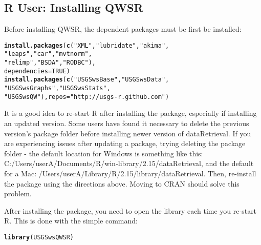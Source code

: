 \documentclass[a4paper,11pt]{article}\usepackage{graphicx, color}
\makeatletter
\newcommand{\hlfunctioncall}[1]{\textcolor[rgb]{0.501960784313725,0,0.329411764705882}{\textbf{#1}}}%
\newcommand{\hlstring}[1]{\textcolor[rgb]{0.6,0.6,1}{#1}}%
\newenvironment{kframe}{%
 \def\at@end@of@kframe{}%
 \ifinner\ifhmode%
  \def\at@end@of@kframe{\end{minipage}}%
  \begin{minipage}{\columnwidth}%
 \fi\fi%
 \def\FrameCommand##1{\hskip\@totalleftmargin \hskip-\fboxsep
 \colorbox{shadecolor}{##1}\hskip-\fboxsep
     \hskip-\linewidth \hskip-\@totalleftmargin \hskip\columnwidth}%
 \MakeFramed {\advance\hsize-\width
   \@totalleftmargin\z@ \linewidth\hsize
   \@setminipage}}%
 {\par\unskip\endMakeFramed%
 \at@end@of@kframe}
\newenvironment{knitrout}{}{} %
\makeatother
\begin{document}
\subsection{R User: Installing QWSR}
Before installing QWSR, the dependent packages must be first be installed:

\begin{knitrout}
\color{fgcolor}\begin{kframe}
\begin{alltt}
\hlfunctioncall{install.packages}(\hlfunctioncall{c}(\hlstring{"XML"}, \hlstring{"lubridate"}, \hlstring{"akima"}, 
                   \hlstring{"leaps"}, \hlstring{"car"}, \hlstring{"mvtnorm"}, 
                   \hlstring{"relimp"}, \hlstring{"BSDA"}, \hlstring{"RODBC"}), 
                 dependencies=TRUE)
\hlfunctioncall{install.packages}(\hlfunctioncall{c}(\hlstring{"USGSwsBase"},\hlstring{"USGSwsData"},
                   \hlstring{"USGSwsGraphs"},\hlstring{"USGSwsStats"},
                   \hlstring{"USGSwsQW"}), repos=\hlstring{"http://usgs-r.github.com"})
\end{alltt}
\end{kframe}
\end{knitrout}


It is a good idea to re-start R after installing the package, especially if installing an updated version. Some users have found it necessary to delete the previous version's package folder before installing newer version of dataRetrieval. If you are experiencing issues after updating a package, trying deleting the package folder - the default location for Windows is something like this: C:/Users/userA/Documents/R/win-library/2.15/dataRetrieval, and the default for a Mac: /Users/userA/Library/R/2.15/library/dataRetrieval. Then, re-install the package using the directions above. Moving to CRAN should solve this problem.

After installing the package, you need to open the library each time you re-start R.  This is done with the simple command:
\begin{knitrout}
\color{fgcolor}\begin{kframe}
\begin{alltt}
\hlfunctioncall{library}(USGSwsQWSR)
\end{alltt}
\end{kframe}
\end{knitrout}
\end{document}
